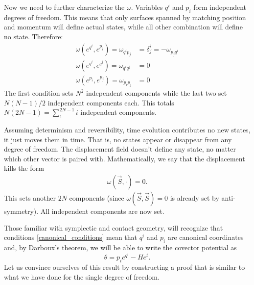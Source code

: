 \documentclass[10pt,twocolumn, nofootinbib]{revtex4-2}
\begin{document}
Now we need to further characterize the $\omega$. Variables $q^i$ and $p_i$ form independent degrees of freedom. This means that only surfaces spanned by matching position and momentum will define actual states, while all other combination will define no state. Therefore:
\begin{equation}\label{canonical_conditions}
\begin{aligned}
	\omega(e^{q^i}, e^{p_j}) = \omega_{q^i p_j} &= \delta^i_j = - \omega_{p_j q^i} \\
	\omega(e^{q^i}, e^{q^j}) = \omega_{q^i q^j} &= 0 \\
	\omega(e^{p_i}, e^{p_j}) = \omega_{p_i p_j} &= 0
\end{aligned}
\end{equation}
The first condition sets $N^2$ independent components while the last two set $N(N-1)/2$ independent components each. This totals $N(2N-1) = \sum_1^{2N-1}i$ independent components.

Assuming determinism and reversibility, time evolution contributes no new states, it just moves them in time. That is, no states appear or disappear from any degree of freedom. The displacement field doesn't define any state, no matter which other vector is paired with. Mathematically, we say that the displacement kills the form
\begin{align}\label{mdof_displacement_kills}
	\omega(\vec{S}, \cdot) = 0.
\end{align}
This sets another $2N$ components (since $\omega(\vec{S}, \vec{S}) = 0$ is already set by anti-symmetry). All independent components are now set.

Those familiar with symplectic and contact geometry, will recognize that conditions \ref{canonical_conditions} mean that $q^i$ and $p_i$ are canonical coordinates and, by Darboux's theorem, we will be able to write the covector potential as
\begin{equation}\label{mdof_potential_expression}
	\theta = p_i e^{q^i} - H e^t.
\end{equation}
Let us convince ourselves of this result by constructing a proof that is similar to what we have done for the single degree of freedom.
\end{document}
